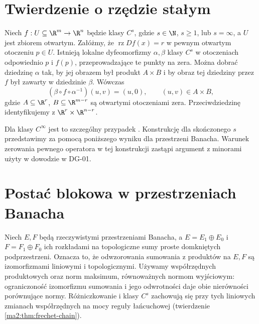 \section{Twierdzenie o rzędzie stałym}

\begin{twierdzenie}
\label{ma2:thm:constant-rank}
Niech $f:U\subseteq\R^m\to\R^n$ będzie klasy $C^s$,
gdzie $s\in\N$, $s\ge1$, lub $s=\infty$, a $U$
jest zbiorem otwartym. Załóżmy, że
$\operatorname{rz}Df(x)=r$ w pewnym otwartym otoczeniu
$p\in U$. Istnieją lokalne dyfeomorfizmy $\alpha,\beta$
klasy $C^s$ w otoczeniach odpowiednio $p$ i $f(p)$,
przeprowadzające te punkty na zera. Można dobrać
dziedzinę $\alpha$ tak, by jej obrazem był produkt
$A\times B$ i by obraz tej dziedziny przez $f$
był zawarty w dziedzinie $\beta$. Wówczas
\[
 (\beta\circ f\circ\alpha^{-1})(u,v)=(u,0),
 \qquad (u,v)\in A\times B,
\]
gdzie $A\subseteq\R^r$, $B\subseteq\R^{m-r}$
są otwartymi otoczeniami zera. Przeciwdziedzinę
identyfikujemy z $\R^r\times\R^{n-r}$.
\end{twierdzenie}

Dla klasy $C^\infty$ jest to szczególny przypadek
.
Konstrukcję dla skończonego $s$ przedstawimy za pomocą
poniższego wyniku dla przestrzeni Banacha. Warunek
zerowania pewnego operatora w tej konstrukcji zastąpi
argument z minorami użyty w dowodzie w DG-01.

\section{Postać blokowa w przestrzeniach Banacha}

Niech $E,F$ będą rzeczywistymi przestrzeniami Banacha,
a $E=E_1\oplus E_0$ i $F=F_1\oplus F_0$ ich rozkładami
na topologiczne sumy proste domkniętych podprzestrzeni. Oznacza to, że odwzorowania sumowania
z produktów na $E,F$ są izomorfizmami liniowymi
i topologicznymi. Używamy współrzędnych produktowych
oraz norm maksimum, równoważnych normom wyjściowym:
ograniczoność izomorfizmu sumowania i jego odwrotności
daje obie nierówności porównujące normy. Różniczkowanie
i klasy $C^s$ zachowują się przy tych liniowych zmianach
współrzędnych na mocy reguły łańcuchowej
(twierdzenie \ref{ma2:thm:frechet-chain}).

